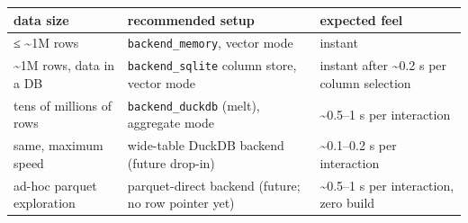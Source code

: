 \documentclass[
  11pt,
]{article}
\newcounter{none} %
\begin{document}
{\def\LTcaptype{none} %
\begin{longtable}[]{@{}
  >{\raggedright\arraybackslash}p{}
  >{\raggedright\arraybackslash}p{}
  >{\raggedright\arraybackslash}p{}@{}}
\toprule\noalign{}
\begin{minipage}[b]{\linewidth}\raggedright
data size
\end{minipage} & \begin{minipage}[b]{\linewidth}\raggedright
recommended setup
\end{minipage} & \begin{minipage}[b]{\linewidth}\raggedright
expected feel
\end{minipage} \\
\midrule\noalign{}
\endhead
\bottomrule\noalign{}
\endlastfoot
≤ \textasciitilde1M rows & \texttt{backend\_memory}, vector mode &
instant \\
\textasciitilde1M rows, data in a DB & \texttt{backend\_sqlite} column
store, vector mode & instant after \textasciitilde0.2 s per column
selection \\
tens of millions of rows & \texttt{backend\_duckdb} (melt), aggregate
mode & \textasciitilde0.5--1 s per interaction \\
same, maximum speed & wide-table DuckDB backend (future drop-in) &
\textasciitilde0.1--0.2 s per interaction \\
ad-hoc parquet exploration & parquet-direct backend (future; no row
pointer yet) & \textasciitilde0.5--1 s per interaction, zero build \\
\end{longtable}
}
\end{document}
